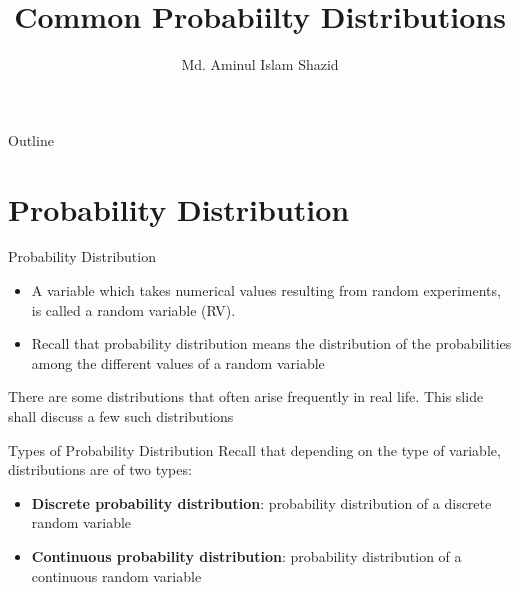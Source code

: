 \documentclass[12pt, aspectratio=169]{beamer}
\title{Common Probabiilty Distributions}
\author{Md. Aminul Islam Shazid}
\date{}
\begin{document}
    {
		\addtocounter{framenumber}{-2}    %

		\begin{frame}
			\titlepage
		\end{frame}

		\begin{frame}{Outline}
            \vfill
			\tableofcontents[subsectionstyle=hide]
            \vfill
		\end{frame}
	}


	\section{Probability Distribution}

	\begin{frame}{Probability Distribution}
		\begin{itemize}
			\item A variable which takes numerical values resulting from random experiments, is called a random variable (RV).
			\item Recall that probability distribution means the distribution of the probabilities among the different values of a random variable
		\end{itemize}
			There are some distributions that often arise frequently in real life. This slide shall discuss a few such distributions
	\end{frame}


	\begin{frame}{Types of Probability Distribution}
		Recall that depending on the type of variable, distributions are of two types:
		\begin{itemize}
			\item \textbf{Discrete probability distribution}: probability distribution of a discrete random variable
			\item \textbf{Continuous probability distribution}: probability distribution of a continuous random variable
		\end{itemize}
	\end{frame}
\end{document}

